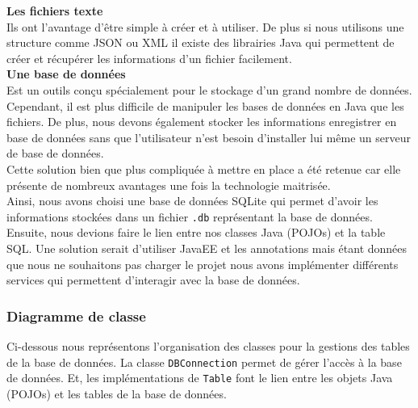 \documentclass[10pt,a4paper]{article}
\begin{document}
\textbf{Les fichiers texte} \\
Ils ont l'avantage d'être simple à créer et à utiliser. De plus si nous utilisons une structure comme JSON ou XML il existe des librairies Java qui permettent de créer et récupérer les informations d'un fichier facilement. \\

\textbf{Une base de données} \\
Est un outils conçu spécialement pour le stockage d'un grand nombre de données. Cependant, il est plus difficile de manipuler les bases de données en Java que les fichiers. De plus, nous devons également stocker les informations enregistrer en base de données sans que l'utilisateur n'est besoin d'installer lui même un serveur de base de données. \\
Cette solution bien que plus compliquée à mettre en place a été retenue car elle présente de nombreux avantages une fois la technologie maitrisée. \\

Ainsi, nous avons choisi une base de données SQLite qui permet d'avoir les informations stockées dans un fichier \verb|.db| représentant la base de données. Ensuite, nous devions faire le lien entre nos classes Java (POJOs) et la table SQL. Une solution serait d'utiliser JavaEE et les annotations mais étant données que nous ne souhaitons pas charger le projet nous avons implémenter différents services qui permettent d'interagir avec la base de données.

\subsubsection{Diagramme de classe} \label{BDD}
Ci-dessous nous représentons l'organisation des classes pour la gestions des tables de la base de données.
La classe \verb|DBConnection| permet de gérer l'accès à la base de données. Et, les implémentations de \verb|Table| font le lien entre les objets Java (POJOs) et les tables de la base de données.
\end{document}
